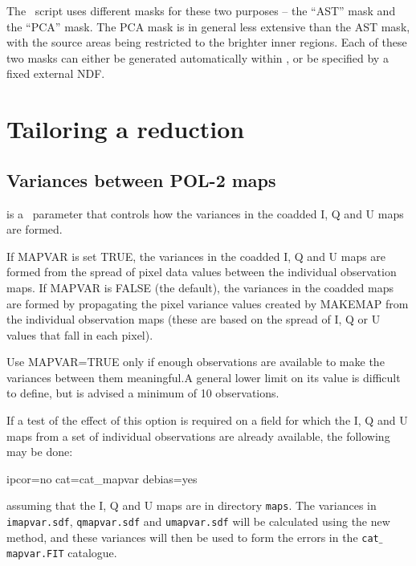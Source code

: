 The \poltwomap\ script uses different masks for these two purposes -- the
``AST'' mask and the ``PCA'' mask.  The PCA mask is in general less
extensive than the AST mask, with the source areas being restricted to
the brighter inner regions.  Each of these two masks can either be
generated automatically within , or be specified by a fixed
external NDF.



\section{Tailoring a reduction}

\subsection*{Variances between POL-2 maps}

 is a \poltwomap\ parameter that controls how the variances in the
coadded I, Q and U maps are formed.

If MAPVAR is set TRUE, the variances in the coadded I, Q and U maps
are formed from the spread of pixel data values between the individual
observation maps. If MAPVAR is FALSE (the default), the variances in
the coadded maps are formed by propagating the pixel variance values
created by MAKEMAP from the individual observation maps (these are
based on the spread of I, Q or U values that fall in each pixel).

Use MAPVAR=TRUE only if enough observations are available to make the
variances between them meaningful.A general lower limit on its value
is difficult to define, but is advised a minimum of 10 observations.


If a test of the effect of this option is required on a field for which
the I, Q and U maps from a set of individual observations are already
available, the following may be done:

\begin{terminalv}
                   ipcor=no cat=cat_mapvar debias=yes
\end{terminalv}

assuming that the I, Q and U maps are in directory \texttt{maps}. The
variances in \texttt{imapvar.sdf}, \texttt{qmapvar.sdf} and
\texttt{umapvar.sdf} will be calculated using the new method, and
these variances will then be used to form the errors in the
\texttt{cat$\_$mapvar.FIT} catalogue.



